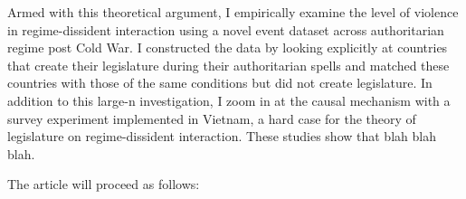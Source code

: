 Armed with this theoretical argument, I empirically examine the level of violence in regime-dissident interaction using a novel event dataset across authoritarian regime post Cold War. I constructed the data by looking explicitly at countries that create their legislature during their authoritarian spells and matched these countries with those of the same conditions but did not create legislature. In addition to this large-n investigation, I zoom in at the causal mechanism with a survey experiment implemented in Vietnam, a hard case for the theory of legislature on regime-dissident interaction. These studies show that blah blah blah.

The article will proceed as follows: